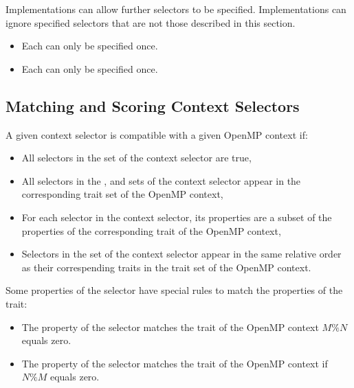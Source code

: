 Implementations can allow further selectors to be specified. Implementations can ignore specified selectors that are not those described in this section.

\restrictions
\begin{itemize}
 \item Each  can only be specified once.
 \item Each  can only be specified once.
\end{itemize}

\subsection{Matching and Scoring Context Selectors}
\label{subsec:Matching and Scoring Context Selectors}

A given context selector is compatible with a given OpenMP context if:
\begin{itemize}
 \item All selectors in the  set of the context selector are true,
 \item All selectors in the ,  and  sets of the context selector appear in the corresponding trait set of the OpenMP context,
 \item For each selector in the context selector, its properties are a subset of the properties of the corresponding trait of the OpenMP context,
 \item Selectors in the  set of the context selector appear in the same relative order as their correspending traits in the  trait set of the OpenMP context.
\end{itemize}

Some properties of the  selector have special rules to match the properties of the  trait:
\begin{itemize}
 \item The \code{)} property of the selector matches the  trait of the OpenMP context $M \% N$ equals zero.
 \item The \code{)} property of the selector matches the  trait of the OpenMP context if $N \% M$ equals zero.
\end{itemize}

